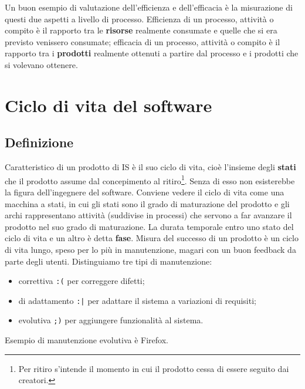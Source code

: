 \documentclass[a4paper]{article}
\begin{document}
		
Un buon esempio di valutazione dell'efficienza e dell'efficacia è la misurazione di questi due aspetti a livello di processo. Efficienza di un processo, attività o compito è il rapporto tra le \textbf{risorse} realmente consumate e quelle che si era previsto venissero consumate; efficacia di un processo, attività o compito è il rapporto tra i \textbf{prodotti} realmente ottenuti a partire dal processo e i prodotti che si volevano ottenere.
	


		
	\section{Ciclo di vita del software}


		
	\subsection{Definizione}

		
Caratteristico di un prodotto di IS è il suo ciclo di vita, cioè l'insieme degli \textbf{stati} che il prodotto assume dal concepimento al ritiro\footnote{Per ritiro s'intende il momento in cui il prodotto cessa di essere seguito dai creatori.}. Senza di esso non esisterebbe la figura dell'ingegnere del software. Conviene vedere il ciclo di vita come una macchina a stati, in cui gli stati sono il grado di maturazione del prodotto e gli archi rappresentano attività (suddivise in processi) che servono a far avanzare il prodotto nel suo grado di maturazione. La durata temporale entro uno stato del ciclo di vita e un altro è detta \textbf{fase}. Misura del successo di un prodotto è un ciclo di vita lungo, speso per lo più in manutenzione, magari con un buon feedback da parte degli utenti. Distinguiamo tre tipi di manutenzione:
		
	\begin{itemize}
		
			
	\item correttiva  \texttt{:(}  per correggere difetti;
			
	\item di adattamento  \texttt{:|}  per adattare il sistema a variazioni di requisiti;
			
	\item evolutiva  \texttt{;)}  per aggiungere funzionalità al sistema.
		
	\end{itemize}

		
Esempio di manutenzione evolutiva è Firefox.
\end{document}
